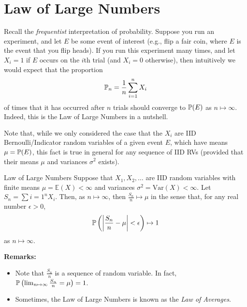 \section{Law of Large Numbers}
Recall the \emph{frequentist} interpretation of probability. Suppose you run an experiment, and let $E$ be some event of interest (e.g., flip a fair coin, where $E$ is the event that you flip heads). If you run this experiment many times, and let $X_i = 1$ if $E$ occurs on the $i$th trial (and $X_i = 0$ otherwise), then intuitively we would expect that the proportion 
\[\mathbb{P}_n = \frac{1}{n} \sum_{i = 1}^{n} X_i\]
of times that it has occurred after $n$ trials should converge to $\mathbb{P}(E)$ as $n \mapsto \infty$. Indeed, this is the Law of Large Numbers in a nutshell. 

\bigskip 

Note that, while we only considered the case that the $X_i$ are IID Bernoulli/Indicator random variables of a given event $E$, which have means $\mu = \mathbb{P}(E)$, this fact is true in general for any sequence of IID RVs (provided that their means $\mu$ and variances $\sigma^2$ exists). 

\begin{theorem}{Law of Large Numbers}{}
    Suppose that $X_1, X_2, \dots$ are IID random variables with finite means $\mu = \mathbb{E}(X) < \infty$ and variances $\sigma^2 = \text{Var}(X) < \infty$. Let $S_n = \sum{i = 1}^{n} X_i$. Then, as $n \mapsto \infty$, then $\frac{S_n}{n} \mapsto \mu$ in the sense that, for any real number $\epsilon > 0$, 
    \[\mathbb{P}\left(\left|\frac{S_n}{n} - \mu\right| < \epsilon\right) \mapsto 1\]
    as $n \mapsto \infty$. 
\end{theorem}
\textbf{Remarks:}
\begin{itemize}
    \item Note that $\frac{S_n}{n}$ is a sequence of random variable. In fact, $\mathbb{P}\left(\lim_{n \mapsto \infty} \frac{S_n}{n} = \mu\right) = 1$.
    \item Sometimes, the Law of Large Numbers is known as the \emph{Law of Averages}.
\end{itemize} 

\bigskip 

